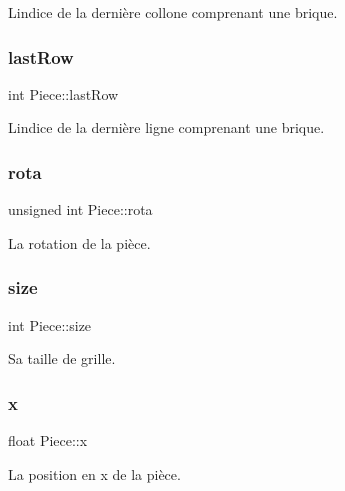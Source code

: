 L\textquotesingle{}indice de la dernière collone comprenant une brique. 

\mbox{\label{struct_piece_aaea62498ff2f91c00dddbe798e73397a}} 
\subsubsection{\texorpdfstring{last\+Row}{lastRow}}
{\footnotesize\ttfamily int Piece\+::last\+Row}



L\textquotesingle{}indice de la dernière ligne comprenant une brique. 

\mbox{\label{struct_piece_ad3c1a967d0ba8aad19e4ed9d9d3e21a4}} 
\subsubsection{\texorpdfstring{rota}{rota}}
{\footnotesize\ttfamily unsigned int Piece\+::rota}



La rotation de la pièce. 

\mbox{\label{struct_piece_ae6aaaa3c177258e1b49d431ba3a12c05}} 
\subsubsection{\texorpdfstring{size}{size}}
{\footnotesize\ttfamily int Piece\+::size}



Sa taille de grille. 

\mbox{\label{struct_piece_aa7f9008e1aa6bacebfd319bfb30c5bcc}} 
\subsubsection{\texorpdfstring{x}{x}}
{\footnotesize\ttfamily float Piece\+::x}



La position en x de la pièce. 

\mbox{\label{struct_piece_a0eea0ecdd99782e029bef01950f596ca}} 
